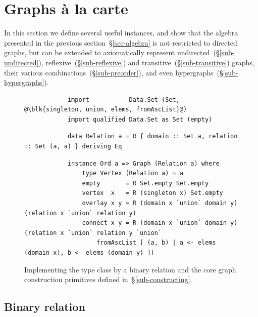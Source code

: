 \section{Graphs \`{a} la carte}\label{sec-a-la-carte}

In this section we define several useful  instances, and
show that the algebra presented in the previous section~\S\ref{sec-algebra} is
not restricted
to directed graphs, but can be extended to axiomatically represent
undirected~(\S\ref{sub-undirected}), reflexive~(\S\ref{sub-reflexive})
and transitive~(\S\ref{sub-transitive}) graphs, their various
combinations~(\S\ref{sub-preorder}), and even hypergraphs~(\S\ref{sub-hypergraphs}).

\begin{figure}
\begin{verbatim}
            import           Data.Set (Set, @\blk{singleton, union, elems, fromAscList}@)
            import qualified Data.Set as Set (empty)
\end{verbatim}
\vspace{1mm}
\begin{verbatim}
            data Relation a = R { domain :: Set a, relation :: Set (a, a) } deriving Eq
\end{verbatim}
\vspace{1mm}
\begin{verbatim}
            instance Ord a => Graph (Relation a) where
                type Vertex (Relation a) = a
                empty       = R Set.empty Set.empty
                vertex  x   = R (singleton x) Set.empty
                overlay x y = R (domain x `union` domain y) (relation x `union` relation y)
                connect x y = R (domain x `union` domain y) (relation x `union` relation y `union`
                    fromAscList [ (a, b) | a <- elems (domain x), b <- elems (domain y) ])
\end{verbatim}
\vspace{-2mm}
\caption{Implementing the  type class by a binary relation
and the core graph construction primitives
defined in~\S\ref{sub-constructing}.\label{fig-relation}}
\vspace{-2mm}
\end{figure}

\subsection{Binary relation}\label{sub-relation}

